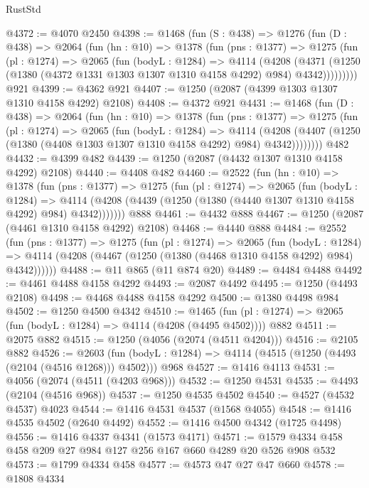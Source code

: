 \begin{lexlean}{RustStd}
\begin{coremodule}
@4372 := @4070 @2450
@4398 := @1468
    (fun (S : @438) =>
    @1276
      (fun (D : @438) =>
      @2064
        (fun (hn : @10) =>
        @1378
          (fun (pns : @1377) =>
          @1275
            (fun (pl : @1274) =>
            @2065
              (fun (bodyL : @1284) =>
              @4114
                (@4208
                  (@4371
                    (@1250 (@1380 (@4372 @1331 @1303 @1307 @1310 @4158 @4292) @984) @4342)))))))))
    @921
@4399 := @4362 @921
@4407 := @1250 (@2087 (@4399 @1303 @1307 @1310 @4158 @4292) @2108)
@4408 := @4372 @921
@4431 := @1468
    (fun (D : @438) =>
    @2064
      (fun (hn : @10) =>
      @1378
        (fun (pns : @1377) =>
        @1275
          (fun (pl : @1274) =>
          @2065
            (fun (bodyL : @1284) =>
            @4114
              (@4208 (@4407 (@1250 (@1380 (@4408 @1303 @1307 @1310 @4158 @4292) @984) @4342))))))))
    @482
@4432 := @4399 @482
@4439 := @1250 (@2087 (@4432 @1307 @1310 @4158 @4292) @2108)
@4440 := @4408 @482
@4460 := @2522
    (fun (hn : @10) =>
    @1378
      (fun (pns : @1377) =>
      @1275
        (fun (pl : @1274) =>
        @2065
          (fun (bodyL : @1284) =>
          @4114 (@4208 (@4439 (@1250 (@1380 (@4440 @1307 @1310 @4158 @4292) @984) @4342)))))))
    @888
@4461 := @4432 @888
@4467 := @1250 (@2087 (@4461 @1310 @4158 @4292) @2108)
@4468 := @4440 @888
@4484 := @2552
    (fun (pns : @1377) =>
    @1275
      (fun (pl : @1274) =>
      @2065
        (fun (bodyL : @1284) =>
        @4114 (@4208 (@4467 (@1250 (@1380 (@4468 @1310 @4158 @4292) @984) @4342))))))
@4488 := @11 @865 (@11 @874 @20)
@4489 := @4484 @4488
@4492 := @4461 @4488 @4158 @4292
@4493 := @2087 @4492
@4495 := @1250 (@4493 @2108)
@4498 := @4468 @4488 @4158 @4292
@4500 := @1380 @4498 @984
@4502 := @1250 @4500 @4342
@4510 := @1465 (fun (pl : @1274) => @2065 (fun (bodyL : @1284) => @4114 (@4208 (@4495 @4502)))) @882
@4511 := @2075 @882
@4515 := @1250 (@4056 (@2074 (@4511 @4204)))
@4516 := @2105 @882
@4526 := @2603
    (fun (bodyL : @1284) => @4114 (@4515 (@1250 (@4493 (@2104 (@4516 @1268))) @4502)))
    @968
@4527 := @1416 @4113
@4531 := @4056 (@2074 (@4511 (@4203 @968)))
@4532 := @1250 @4531
@4535 := @4493 (@2104 (@4516 @968))
@4537 := @1250 @4535 @4502
@4540 := @4527 (@4532 @4537) @4023
@4544 := @1416 @4531 @4537 (@1568 @4055)
@4548 := @1416 @4535 @4502 (@2640 @4492)
@4552 := @1416 @4500 @4342 (@1725 @4498)
@4556 := @1416 @4337 @4341 (@1573 @4171)
@4571 := @1579 @4334 @458 @458 @209 @27 @984 @127 @256 @167 @660 @4289 @20 @526 @908 @532
@4573 := @1799 @4334 @458
@4577 := @4573 @47 @27 @47 @660
@4578 := @1808 @4334

\end{coremodule}
\end{lexlean}
